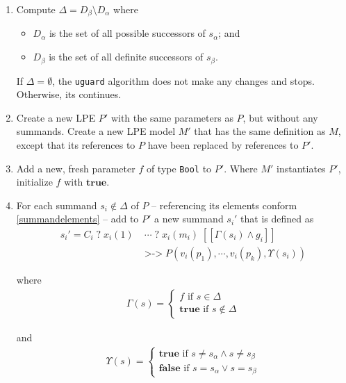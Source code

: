 \begin{enumerate}
\item Compute $\Delta = D_\beta \setminus D_\alpha$ where
\begin{itemize}
\item $D_\alpha$ is the set of all possible successors of $s_\alpha$; and
\item $D_\beta$ is the set of all definite successors of $s_\beta$.
\end{itemize}

If $\Delta = \emptyset{}$, the \texttt{uguard} algorithm does not make any changes and stops. Otherwise, its continues.

\item Create a new LPE $P'$ with the same parameters as $P$, but without any summands.
Create a new LPE model $M'$ that has the same definition as $M$, except that its references to $P$ have been replaced by references to $P'$.

\item Add a new, fresh parameter $f$ of type \texttt{Bool} to $P'$.
Where $M'$ instantiates $P'$, initialize $f$ with $\textbf{true}$.

\item For each summand $s_i \notin \Delta$ of $P$ -- referencing its elements conform \ref{summandelements} -- add to $P'$ a new summand ${s_i}'$ that is defined as
\begin{align*}
{s_i}' = C_i \; \texttt{?} \; x_i(1) \; &\cdots{} \; \texttt{?} \; x_i(m_i) \; [[\Gamma(s_i) \land g_i]] \\
&\texttt{>->} \; P(v_i(p_1), \cdots{}, v_i(p_k), \Upsilon(s_i))
\end{align*}

where
\begin{align*}
\Gamma(s) = \begin{cases}
f \text{ if } s \in \Delta \\
\textbf{true} \text{ if } s \notin \Delta
\end{cases}
\end{align*}

and
\begin{align*}
\Upsilon(s) = \begin{cases}
\textbf{true} \text{ if } s \neq s_\alpha \land s \neq s_\beta \\
\textbf{false} \text{ if } s = s_\alpha \lor s = s_\beta
\end{cases}
\end{align*}
\end{enumerate}

